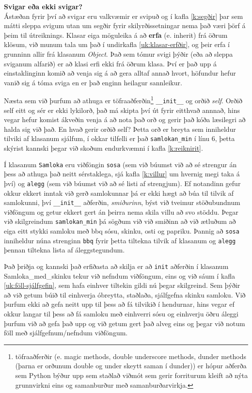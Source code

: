 \begin{itarefni}
\textbf{Svigar eða ekki svigar?}\\
Ástæðan fyrir því að svigar eru valkvæmir er svipuð og í kafla \ref{k:segðir} þar sem mátti sleppa svigum utan um segðir fyrir skilyrðissetningar nema það væri þörf á þeim til útreiknings.
Klasar eiga möguleika á að \textbf{erfa} (e. inherit) frá öðrum klösum, við munum tala um það í undirkafla \ref{uk:klasar-erfðir}, og þeir erfa í grunninn allir frá klasanum \textit{Object}.
Það sem tómur svigi þýðir (eða að sleppa sviganum alfarið) er að klasi erfi ekki frá öðrum klasa.
Því er það upp á einstaklinginn komið að venja sig á að gera alltaf annað hvort, höfundur hefur vanið sig á tóma sviga en er það enginn heilagur sannleikur.
\end{itarefni}

Næsta sem við þurfum að athuga er töfraaðferðin\footnote{töfraaðferðir (e. magic methods, double underscore methods, dunder methods (þarna er orðunum double og under skeytt saman í dunder)) er hópur aðferða sem Python býður upp sem staðlað viðmót sem gerir forriturum kleift að nýta grunnvirkni eins og samanburður með samanburðarvirkja.} \texttt{\_\_init\_\_} og orðið \emph{self}.
Orðið self eitt og sér er ekki lykilorð, það má skipta því út fyrir eitthvað annnað, hins vegar hefur komist ákveðin venja á að nota það orð og gerir það kóða læsilegri að halda sig við það.
En hvað gerir orðið self?
Þetta orð er breyta sem inniheldur tilviki af klasanum sjálfum, í okkar tilfelli er það \texttt{samlokan\_min} í línu 6, þetta skýrist kannski þegar við skoðum endurkvæmni í kafla \ref{k:reiknirit}.

Í klasanum \texttt{Samloka} eru viðföngin \texttt{sosa} (sem við búumst við að sé strengur án þess að athuga það neitt sérstaklega, sjá kafla \ref{k:villur} um hvernig megi taka á því) og \texttt{alegg} (sem við búumst við að sé listi af strengjum).
Ef notandinn gefur okkur ekkert inntak við gerð samlokunnar þá er ekki hægt að búa til tilvik af samlokunni, því \texttt{\_\_init\_\_} aðferðin, \emph{smiðurinn}, býst við tveimur stöðubundnum viðföngum og getur ekkert gert án þeirra nema skila villu að svo stöddu.
Þegar við skilgreindum \texttt{samlokan\_min} þá sögðum við við smiðinn að við ætluðum að eiga eitt stykki samloku með bbq sósu, skinku, osti og papriku.
Þannig að \texttt{sosa} inniheldur núna strenginn \texttt{bbq} fyrir þetta tiltekna tilvik af klasanum og \texttt{alegg} þennan tiltekna lista af áleggstegundum.

Það þriðja og kannski það erfiðasta að skilja er að \texttt{init} aðferðin í klasanum Samloka\_med\_skinku tekur við nefndum viðföngum, eins og við sáum í kafla \ref{uk:föll-sjálfgefin}, sem hafa einhver tiltekin gildi nú þegar skilgreind.
Sem þýðir að við getum búið til einhverja óbreytta, staðlaða, sjálfgefna skinku samloku.
Við þurfum ekki að gefa neitt upp til þess að fá tilvikið í hendurnar, hins vegar ef okkur langar til þess að fá samloku með einhverri sósu og einhverju öðru áleggi þurfum við að gefa það upp og við getum gert það alveg eins og þegar við notum föll með sjálfgefnum/nefndum viðföngum.

